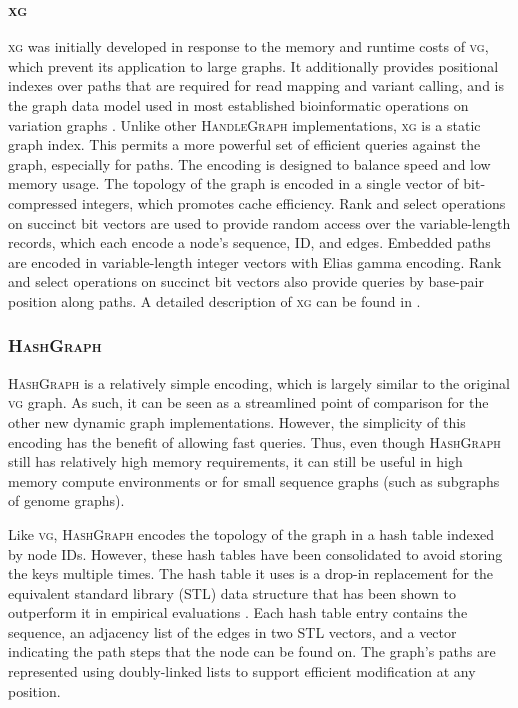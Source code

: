 \documentclass{bioinfo}
\begin{document}
\begin{methods}

\subsubsection{\textsc{xg}}

\textsc{xg} was initially developed in response to the memory and runtime costs of \textsc{vg}, which prevent its application to large graphs.
It additionally provides positional indexes over paths that are required for read mapping and variant calling, and is the graph data model used in most established bioinformatic operations on variation graphs \citep{Garrison_2018,hickey2020genotyping}.
Unlike other \textsc{HandleGraph} implementations, \textsc{xg} is a static graph index.
This permits a more powerful set of efficient queries against the graph, especially for paths.
The encoding is designed to balance speed and low memory usage.
The topology of the graph is encoded in a single vector of bit-compressed integers, which promotes cache efficiency.
Rank and select operations on succinct bit vectors are used to provide random access over the variable-length records, which each encode a node's sequence, ID, and edges.
Embedded paths are encoded in variable-length integer vectors with Elias gamma encoding.
Rank and select operations on succinct bit vectors also provide queries by base-pair position along paths.
A detailed description of \textsc{xg} can be found in \citep{Garrison_2019}.

\subsubsection{\textsc{HashGraph}}

\textsc{HashGraph} is a relatively simple encoding, which is largely similar to the original \textsc{vg} graph.
As such, it can be seen as a streamlined point of comparison for the other new dynamic graph implementations.
However, the simplicity of this encoding has the benefit of allowing fast queries.
Thus, even though \textsc{HashGraph} still has relatively high memory requirements, it can still be useful in high memory compute environments or for small sequence graphs (such as subgraphs of genome graphs).

Like \textsc{vg}, \textsc{HashGraph} encodes the topology of the graph in a hash table indexed by node IDs.
However, these hash tables have been consolidated to avoid storing the keys multiple times.
The hash table it uses is a drop-in replacement for the equivalent standard library (STL) data structure that has been shown to outperform it in empirical evaluations \citep{brehm2019hash}.
Each hash table entry contains the sequence, an adjacency list of the edges in two STL vectors, and a vector indicating the path steps that the node can be found on.
The graph's paths are represented using doubly-linked lists to support efficient modification at any position.


\end{methods}
\end{document}
